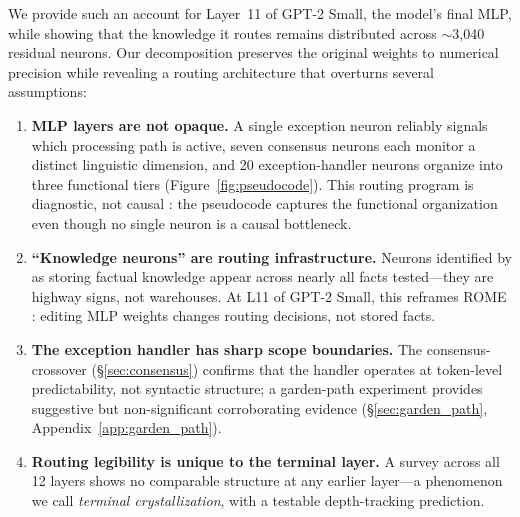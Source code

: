 \documentclass{article}
\begin{document}
We provide such an account for Layer~11 of GPT-2 Small, the model's final MLP,
while showing that the knowledge it routes remains distributed across
$\sim$3{,}040 residual neurons.
Our decomposition preserves the original weights to numerical precision while
revealing a routing architecture that overturns several assumptions:

\begin{enumerate}
\item \textbf{MLP layers are not opaque.}
A single exception neuron reliably signals which processing path is active,
seven consensus neurons each monitor a distinct linguistic dimension, and
20 exception-handler neurons organize into three functional tiers
(Figure~\ref{fig:pseudocode}).
This routing program is diagnostic, not causal \citep{balogh2026discrete}:
the pseudocode captures the functional organization even though no single
neuron is a causal bottleneck.

\item \textbf{``Knowledge neurons'' are routing infrastructure.}
Neurons identified by \citet{dai2022knowledge} as storing factual knowledge
appear across nearly all facts tested---they are highway signs, not warehouses.
At L11 of GPT-2 Small, this reframes ROME \citep{meng2022locating}: editing
MLP weights changes routing decisions, not stored facts.

\item \textbf{The exception handler has sharp scope boundaries.}
The consensus-crossover (\S\ref{sec:consensus}) confirms that the handler
operates at token-level predictability, not syntactic structure;
a garden-path experiment provides suggestive but non-significant
corroborating evidence (\S\ref{sec:garden_path}, Appendix~\ref{app:garden_path}).

\item \textbf{Routing legibility is unique to the terminal layer.}
A survey across all 12 layers shows no comparable structure at any earlier
layer---a phenomenon we call \emph{terminal crystallization}, with a testable
depth-tracking prediction.
\end{enumerate}
\end{document}
